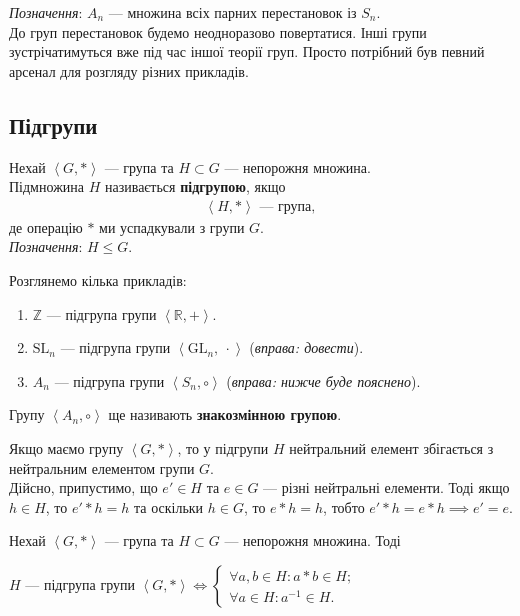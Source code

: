 \documentclass{math_library}
\begin{document}
\textit{Позначення}: $A_n$ --- множина всіх парних перестановок із $S_n$.
\bigskip \\
До груп перестановок будемо неодноразово повертатися. Інші групи зустрічатимуться вже під час іншої теорії груп. Просто потрібний був певний арсенал для розгляду різних прикладів.

\subsection{Підгрупи}
\begin{definition}
Нехай $\left<G,* \right>$ --- група та $H \subset G$ --- непорожня множина.\\
Підмножина $H$ називається \textbf{підгрупою}, якщо 
\begin{align*}
\left<H,* \right> \text{ --- група},
\end{align*}
де операцію $*$ ми успадкували з групи $G$.\\
\textit{Позначення}: $H \leq G$.
\end{definition}

\begin{example}
Розглянемо кілька прикладів:
\begin{enumerate}[nosep,wide=0pt,label={\arabic*.}]
\item $\mathbb{Z}$ --- підгрупа групи $\left<\mathbb{R},+ \right>$.
\item $\mathrm{SL}_n$  --- підгрупа групи $\left<\mathrm{GL}_n,\ \cdot \right>$ (\textit{вправа: довести}).
\item $A_n$ --- підгрупа групи $\left<S_n, \circ\right>$ (\textit{вправа: нижче буде пояснено}).
\end{enumerate}
\end{example}

\begin{definition}
Групу $\left<A_n, \circ\right>$ ще називають \textbf{знакозмінною групою}.
\end{definition}

\begin{remark}
Якщо маємо групу $\left<G,*\right>$, то у підгрупи $H$ нейтральний елемент збігається з нейтральним елементом групи $G$.
\bigskip \\
Дійсно, припустимо, що $e' \in H$ та $e \in G$ --- різні нейтральні елементи. Тоді якщо $h \in H$, то $e' * h = h$ та оскільки $h \in G$, то $e*h = h$, тобто $e'*h = e*h \implies e'=e$.
\end{remark}

\begin{theorem}
Нехай $\left<G,* \right>$ --- група та $H \subset G$ --- непорожня множина. Тоді
\begin{center}
$H$ --- підгрупа групи $\left<G,*\right> \iff \begin{cases} \forall a,b \in H: a*b \in H; \\ \forall a \in H: a^{-1} \in H. \end{cases}$
\end{center}
\end{theorem}
\end{document}
